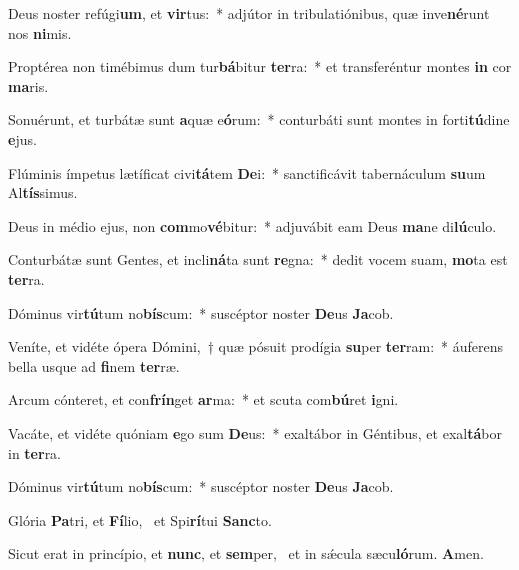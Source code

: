\item Deus noster refúgi\textbf{um}, et \textbf{vir}tus:~* adjútor in tribulatiónibus, quæ inve\textbf{né}runt nos \textbf{ni}mis.
\item Proptérea non timébimus dum tur\textbf{bá}bitur \textbf{ter}ra:~* et transferéntur montes \textbf{in} cor \textbf{ma}ris.
\item Sonuérunt, et turbátæ sunt \textbf{a}quæ e\textbf{ó}rum:~* conturbáti sunt montes in forti\textbf{tú}dine \textbf{e}jus.
\item Flúminis ímpetus lætíficat civi\textbf{tá}tem \textbf{De}i:~* sanctificávit tabernáculum \textbf{su}um Al\textbf{tís}simus.
\item Deus in médio ejus, non \textbf{com}mo\textbf{vé}bitur:~* adjuvábit eam Deus \textbf{ma}ne di\textbf{lú}culo.
\item Conturbátæ sunt Gentes, et incli\textbf{ná}ta sunt \textbf{re}gna:~* dedit vocem suam, \textbf{mo}ta est \textbf{ter}ra.
\item Dóminus vir\textbf{tú}tum no\textbf{bís}\-cum:~* suscéptor noster \textbf{De}us \textbf{Ja}cob.
\item Veníte, et vidéte ópera Dómini,~† quæ pósuit prodígia \textbf{su}per \textbf{ter}ram:~* áuferens bella usque ad \textbf{fi}nem \textbf{ter}ræ.
\item Arcum cónteret, et con\textbf{frín}get \textbf{ar}ma:~* et scuta com\textbf{bú}ret \textbf{i}gni.
\item Vacáte, et vidéte quóniam \textbf{e}go sum \textbf{De}us:~* exaltábor in Géntibus, et exal\textbf{tá}bor in \textbf{ter}ra.
\item Dóminus vir\textbf{tú}tum no\textbf{bís}\-cum:~* suscéptor noster \textbf{De}us \textbf{Ja}cob.
\item Glória \textbf{Pa}tri, et \textbf{Fí}lio,~\psstar{} et Spi\textbf{rí}tui \textbf{Sanc}to.
\item Sicut erat in princípio, et \textbf{nunc}, et \textbf{sem}per,~\psstar{} et in sǽcula sæcu\textbf{ló}rum. \textbf{A}men.
